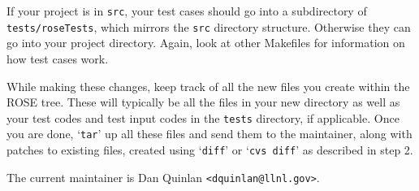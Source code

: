 \begin{enumerate}
If your project is in \verb|src|, your test cases should go into a subdirectory of \verb|tests/roseTests|, which mirrors the \verb|src| directory structure.  Otherwise they can go into your project directory.  Again, look at other Makefiles for information on how test cases work.

While making these changes, keep track of all the new files you create within the ROSE tree.  These will typically be all the files in your new directory as well as your test codes and test input codes in the \verb|tests| directory, if applicable.  Once you are done, `\verb|tar|' up all these files and send them to the maintainer, along with patches to existing files, created using `\verb|diff|' or `\verb|cvs diff|' as described in step 2.
\end{enumerate}

The current maintainer is Dan Quinlan \verb|<dquinlan@llnl.gov>|.
